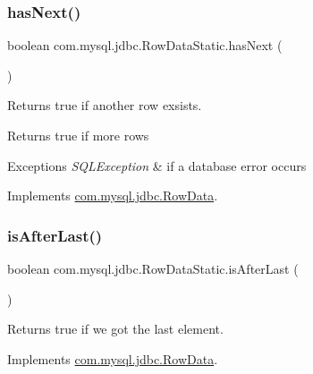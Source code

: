 \subsubsection{\texorpdfstring{has\+Next()}{hasNext()}}
{\footnotesize\ttfamily boolean com.\+mysql.\+jdbc.\+Row\+Data\+Static.\+has\+Next (\begin{DoxyParamCaption}{ }\end{DoxyParamCaption})}

Returns true if another row exsists.

\begin{DoxyReturn}{Returns}
true if more rows 
\end{DoxyReturn}

\begin{DoxyExceptions}{Exceptions}
{\em S\+Q\+L\+Exception} & if a database error occurs \\
\hline
\end{DoxyExceptions}


Implements \mbox{\hyperlink{interfacecom_1_1mysql_1_1jdbc_1_1_row_data_a630ce5b4cd86f8b4d7f71548797c4c16}{com.\+mysql.\+jdbc.\+Row\+Data}}.

\mbox{\label{classcom_1_1mysql_1_1jdbc_1_1_row_data_static_a811d6084ea40248a5e4fb6406f96e404}} 
\subsubsection{\texorpdfstring{is\+After\+Last()}{isAfterLast()}}
{\footnotesize\ttfamily boolean com.\+mysql.\+jdbc.\+Row\+Data\+Static.\+is\+After\+Last (\begin{DoxyParamCaption}{ }\end{DoxyParamCaption})}

Returns true if we got the last element. 

Implements \mbox{\hyperlink{interfacecom_1_1mysql_1_1jdbc_1_1_row_data_ab19688b6d0fbdc4e9b7589e099f28ff7}{com.\+mysql.\+jdbc.\+Row\+Data}}.

\mbox{\label{classcom_1_1mysql_1_1jdbc_1_1_row_data_static_acd81997ad7a1cfc35fbd6e066dd42525}} 
